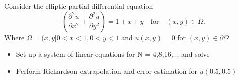 \documentclass[../main.tex]{subfiles}
\begin{document}
Consider the elliptic partial differential equation
\[
	- \left( \frac{\partial ^{2}u}{\partial x^{2}} + \frac{\partial ^{2}u}{\partial y ^{2}} \right)
	=1 +x +y \quad \textrm{for} \quad (x,y) \in \Omega
.\] 
Where $\Omega = {(x,y|0<x<1,0<y<1}$ and $u(x,y)=0$ for $(x,y) \in \partial \Omega$ 

\begin{itemize}
	\item Set up a system of linear equations for N = 4,8,16,... and solve
	\item Perform Richardson extrapolation and error estimation for $u(0.5,0.5)$
\end{itemize}
	
\end{document}
